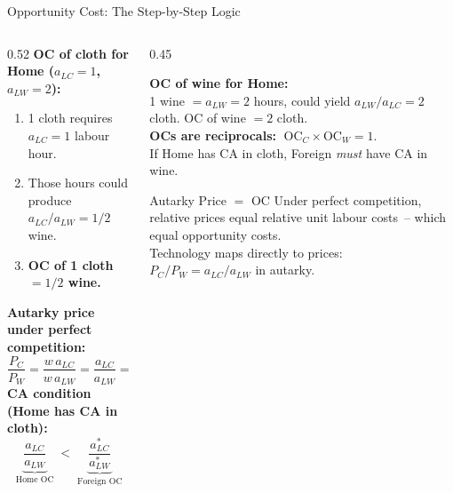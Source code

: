 \documentclass[aspectratio=169]{beamer}
\begin{document}
\begin{frame}{Opportunity Cost: The Step-by-Step Logic}
\begin{columns}[T]
\begin{column}{0.52\textwidth}
\textbf{OC of cloth for Home ($a_{LC}=1$, $a_{LW}=2$):}
\begin{enumerate}\small
  \item 1 cloth requires $a_{LC} = 1$ labour hour.
  \item Those hours could produce $a_{LC}/a_{LW}
        = 1/2$ wine.
  \item \textbf{OC of 1 cloth $= 1/2$ wine.}
\end{enumerate}
\vspace{0.4em}
\textbf{Autarky price under perfect competition:}
\[\frac{P_C}{P_W} = \frac{w\,a_{LC}}{w\,a_{LW}}
  = \frac{a_{LC}}{a_{LW}} = \text{opportunity cost}\]
\vspace{0.1em}
\textbf{CA condition (Home has CA in cloth):}
\[
\underbrace{\frac{a_{LC}}{a_{LW}}}_{\text{Home OC}}
\;<\;
\underbrace{\frac{a_{LC}^{*}}{a_{LW}^{*}}}_{\text{Foreign OC}}
\]
\end{column}
\begin{column}{0.45\textwidth}
\begin{varbox}
\footnotesize\textbf{OC of wine for Home:}\\
1 wine $=a_{LW}=2$ hours, could yield $a_{LW}/a_{LC}=2$
cloth.  OC of wine $= 2$ cloth.\\[0.3em]
\textbf{OCs are reciprocals:}
$\;\text{OC}_C \times \text{OC}_W = 1$.\\[0.3em]
If Home has CA in cloth, Foreign \emph{must} have CA in
wine.
\end{varbox}
\vspace{0.4em}
\begin{insight}{Autarky Price $=$ OC}
\footnotesize Under perfect competition, relative prices
equal relative unit labour costs~-- which equal
opportunity costs.\\[0.2em]
Technology maps directly to prices:\\
$P_C/P_W = a_{LC}/a_{LW}$ in autarky.
\end{insight}
\end{column}
\end{columns}
\end{frame}
\end{document}
